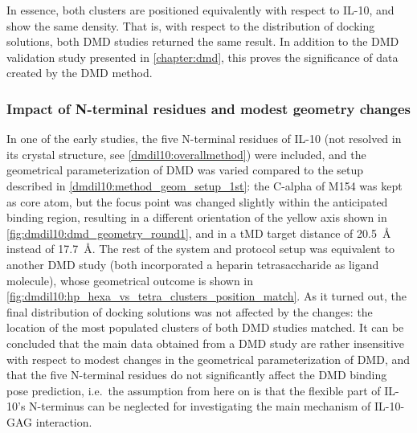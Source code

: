 In essence, both clusters are positioned equivalently with respect to IL-10, and
show the same density. That is, with respect to the distribution of docking
solutions, both DMD studies returned the same result. In addition to the DMD
validation study presented in \cref{chapter:dmd}, this proves the significance
of data created by the DMD method.


\subsubsection{Impact of N-terminal residues and modest geometry changes}

In one of the early studies, the five N-terminal residues of IL-10 (not resolved
in its crystal structure, see \ref{dmdil10:overallmethod}) were included, and
the geometrical parameterization of DMD was varied compared to the setup
described in \ref{dmdil10:method_geom_setup_1st}: the C-alpha of M154 was kept
as core atom, but the focus point was changed slightly within the anticipated
binding region, resulting in a different orientation of the yellow axis shown in
\cref{fig:dmdil10:dmd_geometry_round1}, and in a tMD target distance of
\SI{20.5}{\angstrom} instead of \SI{17.7}{\angstrom}. The rest of the system and
protocol setup was equivalent to another DMD study (both incorporated a heparin
tetrasaccharide as ligand molecule), whose geometrical outcome is shown in
\cref{fig:dmdil10:hp_hexa_vs_tetra_clusters_position_match}. As it turned out,
the final distribution of docking solutions was not affected by the changes: the
location of the most populated clusters of both DMD studies matched. It can be
concluded that the main data obtained from a DMD study are rather insensitive
with respect to modest changes in the geometrical parameterization of DMD, and
that the five N-terminal residues do not significantly affect the DMD binding
pose prediction, i.e.\ the assumption from here on is that the flexible part of
IL-10's N-terminus can be neglected for investigating the main mechanism of
IL-10-GAG interaction.



